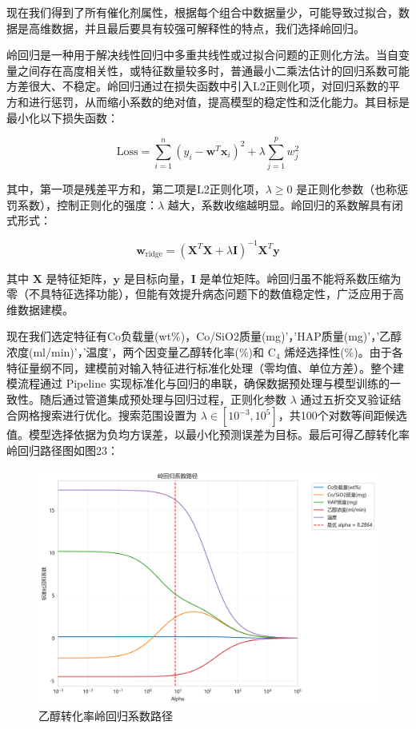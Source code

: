 现在我们得到了所有催化剂属性，根据每个组合中数据量少，可能导致过拟合，数据是高维数据，并且最后要具有较强可解释性的特点，我们选择岭回归。

岭回归是一种用于解决线性回归中多重共线性或过拟合问题的正则化方法。当自变量之间存在高度相关性，或特征数量较多时，普通最小二乘法估计的回归系数可能方差很大、不稳定。岭回归通过在损失函数中引入L2正则化项，对回归系数的平方和进行惩罚，从而缩小系数的绝对值，提高模型的稳定性和泛化能力。其目标是最小化以下损失函数：

$$
\text{Loss} = \sum_{i=1}^{n} (y_i - \mathbf{w}^T \mathbf{x}_i)^2 + \lambda \sum_{j=1}^{p} w_j^2
$$

其中，第一项是残差平方和，第二项是L2正则化项，$\lambda \geq 0$ 是正则化参数（也称惩罚系数），控制正则化的强度：$\lambda$ 越大，系数收缩越明显。岭回归的系数解具有闭式形式：

$$
\mathbf{w}_{\text{ridge}} = (\mathbf{X}^T \mathbf{X} + \lambda \mathbf{I})^{-1} \mathbf{X}^T \mathbf{y}
$$

其中 $\mathbf{X}$ 是特征矩阵，$\mathbf{y}$ 是目标向量，$\mathbf{I}$ 是单位矩阵。岭回归虽不能将系数压缩为零（不具特征选择功能），但能有效提升病态问题下的数值稳定性，广泛应用于高维数据建模。

现在我们选定特征有Co负载量(wt\%)，Co/SiO2质量(mg)'，'HAP质量(mg)'，'乙醇浓度(ml/min)'，'温度'，两个因变量乙醇转化率(\%)和 \( \text{C}_4 \) 烯烃选择性(\%)。由于各特征量纲不同，建模前对输入特征进行标准化处理（零均值、单位方差）。整个建模流程通过 Pipeline 实现标准化与回归的串联，确保数据预处理与模型训练的一致性。随后通过管道集成预处理与回归过程，正则化参数 $ \lambda $ 通过五折交叉验证结合网格搜索进行优化。搜索范围设置为 $ \lambda \in [10^{-3}, 10^{5}] $，共100个对数等间距候选值。模型选择依据为负均方误差，以最小化预测误差为目标。最后可得乙醇转化率岭回归路径图如图23：

\begin{figure}[h]%
	\centering%
	\includegraphics [scale=0.6]{图/ling-yichun.png}
	\caption{乙醇转化率岭回归系数路径} 
	\label{fig:1}
\end{figure}



